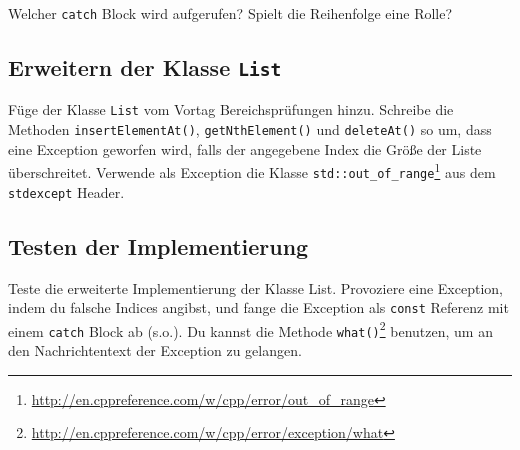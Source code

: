 Welcher \lstinline{catch} Block wird aufgerufen?
Spielt die Reihenfolge eine Rolle?

\subsection{Erweitern der Klasse \lstinline{List}}
Füge der Klasse \lstinline{List} vom Vortag Bereichsprüfungen hinzu.
Schreibe die Methoden \lstinline{insertElementAt()}, \lstinline{getNthElement()} und \lstinline{deleteAt()} so um, dass eine Exception geworfen wird, falls der angegebene Index die Größe der Liste überschreitet.
Verwende als Exception die Klasse \lstinline{std::out_of_range}\footnote{\url{http://en.cppreference.com/w/cpp/error/out_of_range}} aus dem \lstinline{stdexcept} Header.


\subsection{Testen der Implementierung}
Teste die erweiterte Implementierung der Klasse List.
Provoziere eine Exception, indem du falsche Indices angibst, und fange die Exception als \lstinline{const} Referenz mit einem \lstinline{catch} Block ab (s.o.).
Du kannst die Methode \lstinline{what()}\footnote{\url{http://en.cppreference.com/w/cpp/error/exception/what}} benutzen, um an den Nachrichtentext der Exception zu gelangen.
